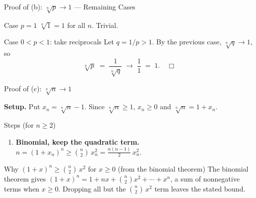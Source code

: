 \documentclass[aspectratio=169,12pt,t]{beamer}
\begin{document}
{%
\begin{frame}{Proof of (b): $\sqrt[n]{p} \to 1$ --- Remaining Cases}
  \begin{proofblock}{Case $p = 1$}
    $\sqrt[n]{1} = 1$ for all $n$. Trivial.
  \end{proofblock}

  \begin{proofblock}{Case $0 < p < 1$: take reciprocals}
    Let $q = 1/p > 1$. By the previous case, $\sqrt[n]{q} \to 1$, so
    \[
      \sqrt[n]{p} \;=\; \frac{1}{\sqrt[n]{q}} \;\to\; \frac{1}{1} \;=\; 1. \quad \Box
    \]
  \end{proofblock}

\end{frame}

\begin{frame}{Proof of (c): $\sqrt[n]{n} \to 1$}
  \begin{hlbox}
    \textbf{Setup.} Put $x_n = \sqrt[n]{n} - 1$. Since $\sqrt[n]{n} \geq 1$, $x_n \geq 0$ and $\sqrt[n]{n} = 1 + x_n$.
  \end{hlbox}

  \vspace{0.4em}
  \begin{proofblock}{Steps (for $n \geq 2$)}
    \begin{enumerate}
      \item \textbf{Binomial, keep the quadratic term.}
        $\displaystyle n = (1 + x_n)^n \geq \binom{n}{2}\, x_n^2 = \frac{n(n-1)}{2}\, x_n^2.$
    \end{enumerate}
  \end{proofblock}

  \vspace{0.2em}
  \begin{remblock}{Why $(1+x)^n \geq \binom{n}{2}\, x^2$ for $x \geq 0$ \;(from the binomial theorem)}
    The binomial theorem gives $(1+x)^n = 1 + nx + \binom{n}{2} x^2 + \cdots + x^n$,
    a sum of nonnegative terms when $x \geq 0$. Dropping all but the $\binom{n}{2}\, x^2$
    term leaves the stated bound.
  \end{remblock}


\end{frame}}
\end{document}
